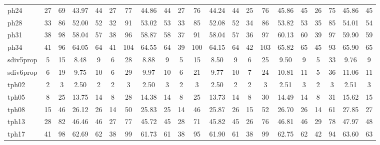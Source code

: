 \documentclass[runningheads]{llncs}
\begin{document}
\begin{table}[]
{\begin{tabular}{ l|c  c c c| c c c c | c c c c | c c c c | c c c c|}
			ph24 & 27 & 69 & 43.97 & 44 & 27 & 77 & 44.86 & 44 & 27 & 76 & 44.24 & 44 & 25 & 76 & 45.86 & 45 & 26 & 75 & 45.86 & 45 \\\cline{1-21}  
			ph28 & 33 & 86 & 52.00 & 52 & 32 & 91 & 53.02 & 53 & 33 & 85 & 52.08 & 52 & 34 & 86 & 53.82 & 53 & 35 & 85 & 54.01 & 54 \\\cline{1-21}  
			ph31 & 38 & 98 & 58.04 & 57 & 38 & 96 & 58.87 & 58 & 37 & 91 & 58.04 & 57 & 36 & 97 & 60.13 & 60 & 39 & 97 & 59.90 & 59 \\\cline{1-21}  
			ph34 & 41 & 96 & 64.05 & 64 & 41 & 104 & 64.55 & 64 & 39 & 100 & 64.15 & 64 & 42 & 103 & 65.82 & 65 & 45 & 93 & 65.90 & 65 \\\cline{1-21}
			sdiv5prop & 5 & 15 & 8.48 & 9 & 6 & 28 & 8.88 & 9 & 5 & 15 & 8.50 & 9 & 6 & 25 & 9.50 & 9 & 5 & 33 & 9.76 & 9 \\\cline{1-21}  
			sdiv6prop & 6 & 19 & 9.75 & 10 & 6 & 29 & 9.97 & 10 & 6 & 21 & 9.77 & 10 & 7 & 24 & 10.81 & 11 & 5 & 36 & 11.06 & 11 \\\cline{1-21}  
			tph02 & 2 & 3 & 2.50 & 2 & 2 & 3 & 2.50 & 3 & 2 & 3 & 2.50 & 2 & 2 & 3 & 2.51 & 3 & 2 & 3 & 2.51 & 3 \\\cline{1-21}  
			tph05 & 8 & 25 & 13.75 & 14 & 8 & 28 & 14.38 & 14 & 8 & 25 & 13.73 & 14 & 8 & 30 & 14.49 & 14 & 8 & 31 & 15.62 & 15 \\\cline{1-21}  
			tph08 & 15 & 46 & 26.12 & 26 & 14 & 50 & 25.83 & 25 & 14 & 46 & 25.87 & 26 & 15 & 52 & 26.70 & 26 & 14 & 61 & 27.85 & 27 \\\cline{1-21}  
			tph13 & 28 & 82 & 46.46 & 46 & 27 & 77 & 45.72 & 45 & 28 & 71 & 45.82 & 45 & 26 & 76 & 46.81 & 46 & 29 & 78 & 47.97 & 48 \\\cline{1-21}  
			tph17 & 41 & 98 & 62.69 & 62 & 38 & 99 & 61.73 & 61 & 38 & 95 & 61.90 & 61 & 38 & 99 & 62.75 & 62 & 42 & 94 & 63.60 & 63 \\\cline{1-21}  

\end{tabular}}
\end{table}
\end{document}
